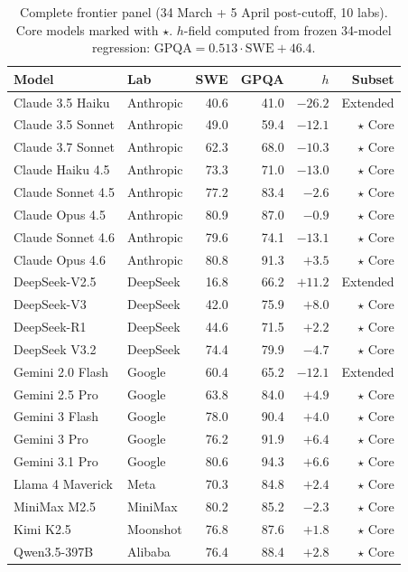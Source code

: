 \documentclass{article}
\begin{document}
\begin{table}[h]
\centering
\caption{Complete frontier panel (34 March + 5 April post-cutoff, 10 labs). Core models marked with $\star$.
$h$-field computed from frozen 34-model regression: $\text{GPQA} = 0.513 \cdot \text{SWE} + 46.4$.}
\label{tab:full}
\begin{tabular}{llrrrr}
\toprule
Model & Lab & SWE & GPQA & $h$ & Subset \\
\midrule
Claude 3.5 Haiku & Anthropic & 40.6 & 41.0 & $-26.2$ & Extended \\
Claude 3.5 Sonnet & Anthropic & 49.0 & 59.4 & $-12.1$ & $\star$ Core \\
Claude 3.7 Sonnet & Anthropic & 62.3 & 68.0 & $-10.3$ & $\star$ Core \\
Claude Haiku 4.5 & Anthropic & 73.3 & 71.0 & $-13.0$ & $\star$ Core \\
Claude Sonnet 4.5 & Anthropic & 77.2 & 83.4 & $-2.6$ & $\star$ Core \\
Claude Opus 4.5 & Anthropic & 80.9 & 87.0 & $-0.9$ & $\star$ Core \\
Claude Sonnet 4.6 & Anthropic & 79.6 & 74.1 & $-13.1$ & $\star$ Core \\
Claude Opus 4.6 & Anthropic & 80.8 & 91.3 & $+3.5$ & $\star$ Core \\
DeepSeek-V2.5 & DeepSeek & 16.8 & 66.2 & $+11.2$ & Extended \\
DeepSeek-V3 & DeepSeek & 42.0 & 75.9 & $+8.0$ & $\star$ Core \\
DeepSeek-R1 & DeepSeek & 44.6 & 71.5 & $+2.2$ & $\star$ Core \\
DeepSeek V3.2 & DeepSeek & 74.4 & 79.9 & $-4.7$ & $\star$ Core \\
Gemini 2.0 Flash & Google & 60.4 & 65.2 & $-12.1$ & Extended \\
Gemini 2.5 Pro & Google & 63.8 & 84.0 & $+4.9$ & $\star$ Core \\
Gemini 3 Flash & Google & 78.0 & 90.4 & $+4.0$ & $\star$ Core \\
Gemini 3 Pro & Google & 76.2 & 91.9 & $+6.4$ & $\star$ Core \\
Gemini 3.1 Pro & Google & 80.6 & 94.3 & $+6.6$ & $\star$ Core \\
Llama 4 Maverick & Meta & 70.3 & 84.8 & $+2.4$ & $\star$ Core \\
MiniMax M2.5 & MiniMax & 80.2 & 85.2 & $-2.3$ & $\star$ Core \\
Kimi K2.5 & Moonshot & 76.8 & 87.6 & $+1.8$ & $\star$ Core \\
Qwen3.5-397B & Alibaba & 76.4 & 88.4 & $+2.8$ & $\star$ Core \\

\end{tabular}
\end{table}
\end{document}
